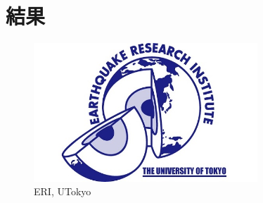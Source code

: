 \chapter{結果}\label{chap:result}

\begin{figure}[h]
\centering
\includegraphics[width=0.75\textwidth]{eri.png}
\caption{\label{fig:z-1}ERI, UTokyo}
\end{figure}